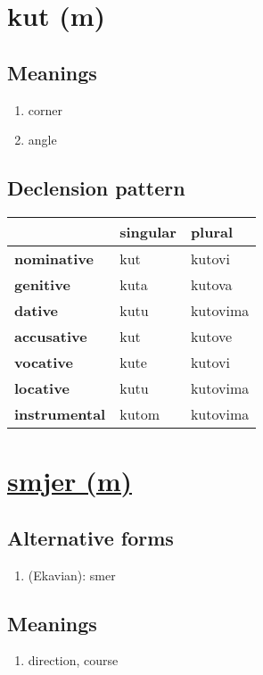 \filbreak
\section{kut (m)}
\subsection*{Meanings}
\begin{enumerate}
\item corner
\item angle
\end{enumerate}
\subsection*{Declension pattern}
\begin{tabularx}{\linewidth}{Xll}
\toprule
{} & singular &    plural \\
\midrule
\textbf{nominative  } &      kut &    kutovi \\
\textbf{genitive    } &     kuta &    kutova \\
\textbf{dative      } &     kutu &  kutovima \\
\textbf{accusative  } &      kut &    kutove \\
\textbf{vocative    } &     kute &    kutovi \\
\textbf{locative    } &     kutu &  kutovima \\
\textbf{instrumental} &    kutom &  kutovima \\
\bottomrule
\end{tabularx}

\filbreak
\section{\underline{smjer (m)}}
\subsection*{Alternative forms}
\begin{enumerate}
\item (Ekavian): smer
\end{enumerate}
\subsection*{Meanings}
\begin{enumerate}
\item direction, course
\end{enumerate}
